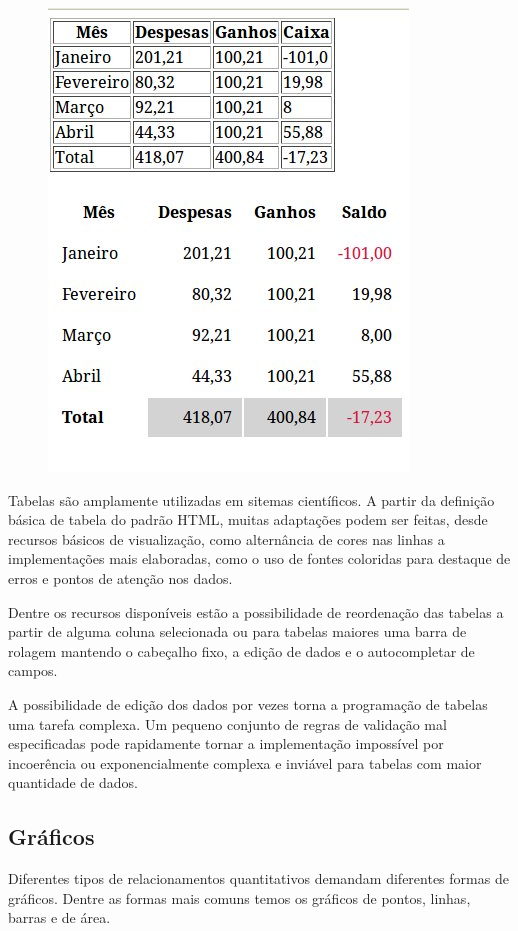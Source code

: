 \documentclass[]{article}
\begin{document}
\begin{figure}[h]
\centering
\includegraphics[scale=.5]{./table2}
\caption{}
\label{fig:table2}
\end{figure}

Tabelas são amplamente utilizadas em sitemas científicos. A partir da definição básica de tabela do padrão HTML, muitas adaptações podem ser feitas, desde recursos básicos de visualização, como alternância de cores nas linhas a implementações mais elaboradas, como o uso de fontes coloridas para destaque de erros e pontos de atenção nos dados. 

Dentre os recursos disponíveis estão a possibilidade de reordenação das tabelas a partir de alguma coluna selecionada ou para tabelas maiores uma barra de rolagem mantendo o cabeçalho fixo, a edição de dados e o autocompletar de campos.

A possibilidade de edição dos dados por vezes torna a programação de tabelas uma tarefa complexa. Um pequeno conjunto de regras de validação mal especificadas pode rapidamente tornar a implementação impossível por incoerência ou exponencialmente complexa e inviável para tabelas com maior quantidade de dados. 

\subsection{Gráficos}

Diferentes tipos de relacionamentos quantitativos demandam diferentes formas de gráficos. Dentre as formas mais comuns temos os gráficos de pontos, linhas, barras e de área.
\end{document}
